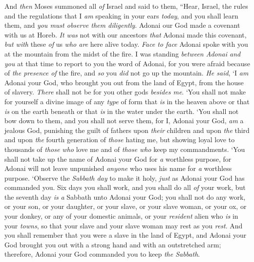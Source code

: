 \begin{biblechapter} %
 And \textit{then} Moses summoned all \textit{of} Israel and said to them, “Hear, Israel, the rules and the regulations that I \textit{am} speaking in your ears \textit{today}, and you shall learn them, and \textit{you must observe them diligently}.
\verse Adonai our God made a covenant with us at Horeb.
\verse \textit{It was} not with our ancestors \textit{that} Adonai made this covenant, \textit{but with} these \textit{of} us \textit{who are} here alive today.
\verse \textit{Face to face} Adonai spoke with you at the mountain from the midst of the fire.
\verse I was standing \textit{between Adonai and you} at that time to report to you the word of Adonai, for you were afraid because of \textit{the presence of} the fire, and \textit{so} you \textit{did} not go up the mountain. \textit{He said},
\verse ‘I \textit{am} Adonai your God, who brought you out from the land of Egypt, from the house of slavery.
\verse \textit{There} shall not be for you other gods \textit{besides me}.
\verse ‘You shall not make for yourself a divine image of any \textit{type} of form that \textit{is} in the heaven above or that \textit{is} on the earth beneath or that \textit{is} in the water under the earth.
\verse ‘You shall not bow down to them, and you shall not serve them, for I, Adonai your God, \textit{am} a jealous God, punishing the guilt of fathers upon \textit{their} children and upon \textit{the} third and upon \textit{the} fourth generation of \textit{those} hating me,
\verse but showing loyal love to thousands of \textit{those who} love me and of \textit{those who} keep my commandments.
\verse ‘You shall not take up the name of Adonai your God for \textit{a} worthless purpose, for Adonai will not leave unpunished \textit{anyone} who uses his name for \textit{a} worthless purpose.
\verse ‘Observe the \textit{Sabbath day} to make it holy, \textit{just} as Adonai your God has commanded you.
\verse Six days you shall work, and you shall do all \textit{of} your work,
\verse but the seventh day \textit{is} \textit{a} Sabbath unto Adonai your God; you shall not do any work, or your son, or your daughter, or your slave, or your slave woman, or your ox, or your donkey, or any of your domestic animals, or your \textit{resident} alien who \textit{is} in your \textit{towns}, so that your slave and your slave woman may rest as you \textit{rest}.
\verse And you shall remember that you were a slave in the land of Egypt, and Adonai your God brought you out with a strong hand and with an outstretched arm; therefore, Adonai your God commanded you to keep \textit{the Sabbath}.

\end{biblechapter}
